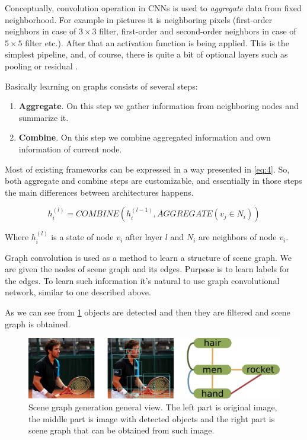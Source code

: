 Conceptually, convolution operation in CNNs is used to \textit{aggregate} data from fixed neighborhood. For example in pictures it is neighboring pixels (first-order neighbors in case of $3\times 3$ filter, first-order and second-order neighbors in case of $5\times 5$ filter etc.). After that an activation function is being applied. This is the simplest pipeline, and, of course, there is quite a bit of optional layers such as pooling or residual \cite{He_Zhang_Ren_Sun_2015}.

Basically learning on graphs consists of several steps:

\begin{enumerate}
    \item \textbf{Aggregate}. On this step we gather information from neighboring nodes and summarize it.
    \item \textbf{Combine}. On this step we combine aggregated information and own information of current node.
\end{enumerate}

Most of existing frameworks can be expressed in a way presented in \ref{eq:4}. So, both aggregate and combine steps are customizable, and essentially in those steps the main differences between architectures happens.

\begin{equation}
    \label{eq:4}
    h_i^{(l)}=COMBINE(h_i^{(l-1)}, AGGREGATE(v_j\in N_i))
\end{equation}

Where $h_i^{(l)}$ is a state of node $v_i$ after layer $l$ and $N_i$ are neighbors of node $v_i$.

Graph convolution is used as a method to learn a structure of scene graph. We are given the nodes of scene graph and its edges. Purpose is to learn labels for the edges. To learn such information it's natural to use graph convolutional network, similar to one described above.

As we can see from \ref{scene-graph-example} objects are detected and then they are filtered and scene graph is obtained.

\begin{figure}[!h]
    \centering
    \includegraphics[width=\textwidth]{figure/scene-graph-example.png}
    \caption{Scene graph generation general view. The left part is original image, the middle part is image with detected objects and the right part is scene graph that can be obtained from such image.}
    \label{scene-graph-example}
\end{figure}


